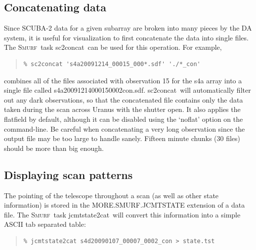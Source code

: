 \documentclass[twoside,11pt]{article}
\newcommand{\xref}[3]{#1}
\newcommand{\xlabel}[1]{}
\renewcommand{\_}{\texttt{\symbol{95}}}
\newenvironment{myquote}{\begin{quote}\begin{small}}{\end{small}\end{quote}}
\newcommand{\smurf}{\xref{\textsc{Smurf}}{sun258}{}}
\newcommand{\task}[1]{\textsf{#1}}
\newcommand{\concat}{\xref{\task{sc2concat}}{sun258}{SC2CONCAT}}
\newcommand{\jcmtstate}{\xref{\task{jcmtstate2cat}}{sun258}{JCMTSTATE2CAT}}
\begin{document}
\subsection{\xlabel{concat}Concatenating data}

Since SCUBA-2 data for a given subarray are broken into many pieces by
the DA system, it is useful for visualization to first concatenate the
data into single files. The \smurf\ task \concat\ can be used for this
operation. For example,

\begin{myquote}
\begin{verbatim}
% sc2concat 's4a20091214_00015_000*.sdf' './*_con'
\end{verbatim}
\end{myquote}

combines all of the files associated with observation 15 for the s4a
array into a single file called
s4a20091214\_00015\_0002\_con.sdf. \concat\ will automatically filter
out any dark observations, so that the concatenated file contains only
the data taken during the scan across Uranus with the shutter open. It
also applies the flatfield by default, although it can be disabled using
the `noflat' option on the command-line. Be careful when concatenating
a very long observation since the output file may be too large to
handle sanely. Fifteen minute chunks (30 files) should be more than
big enough. 

\subsection{\xlabel{display_scan}Displaying scan patterns}

The pointing of the telescope throughout a scan (as well as other
state information) is stored in the MORE.SMURF.JCMTSTATE extension of
a data file. The \smurf\ task \jcmtstate\ will convert this
information into a simple ASCII tab separated table:

\begin{myquote}
\begin{verbatim}
% jcmtstate2cat s4d20090107_00007_0002_con > state.tst
\end{verbatim}
\end{myquote}
\end{document}
